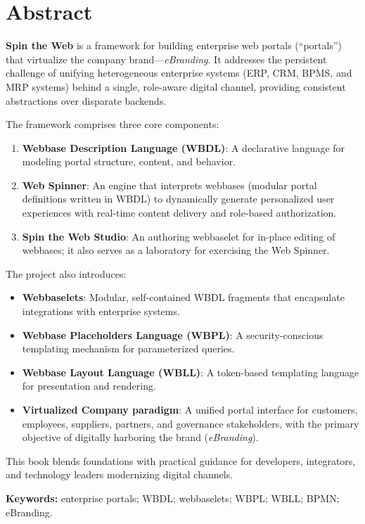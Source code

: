 
\chapter*{Abstract}

\textbf{Spin the Web} is a framework for building enterprise web portals (``portals'') that virtualize the company brand—\textit{eBranding}. It addresses the persistent challenge of unifying heterogeneous enterprise systems (ERP, CRM, BPMS, and MRP systems) behind a single, role-aware digital channel, providing consistent abstractions over disparate backends.

The framework comprises three core components:
\begin{enumerate}
\item \textbf{Webbase Description Language (WBDL)}: A declarative language for modeling portal structure, content, and behavior.
\item \textbf{Web Spinner}: An engine that interprets webbases (modular portal definitions written in WBDL) to dynamically generate personalized user experiences with real-time content delivery and role-based authorization.
\item \textbf{Spin the Web Studio}: An authoring webbaselet for in-place editing of webbases; it also serves as a laboratory for exercising the Web Spinner.
\end{enumerate}

The project also introduces:
\begin{itemize}
\item \textbf{Webbaselets}: Modular, self-contained WBDL fragments that encapsulate integrations with enterprise systems.
\item \textbf{Webbase Placeholders Language (WBPL)}: A security-conscious templating mechanism for parameterized queries.
\item \textbf{Webbase Layout Language (WBLL)}: A token-based templating language for presentation and rendering.
\item \textbf{Virtualized Company paradigm}: A unified portal interface for customers, employees, suppliers, partners, and governance stakeholders, with the primary objective of digitally harboring the brand (\textit{eBranding}).
\end{itemize}

This book blends foundations with practical guidance for developers, integrators, and technology leaders modernizing digital channels.

\textbf{Keywords:} enterprise portals; WBDL; webbaselets; WBPL; WBLL; BPMN; eBranding.



\clearpage
